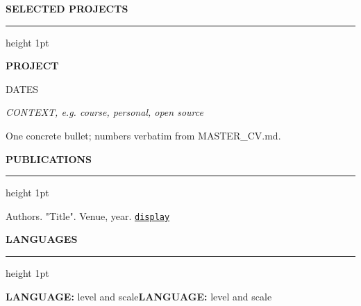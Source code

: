\documentclass[11pt]{article}
\newcommand{\keepwithnext}{\par\ifdim\dimexpr\pagegoal-\pagetotal\relax<5\baselineskip\newpage\fi}
\newcommand{\cvsection}[1]{%
  \keepwithnext\vspace{8pt}%
  {\displayfont\large\bfseries\color{accent}\MakeUppercase{#1}}\par
  \nointerlineskip\vspace{2.5pt}%
  {\color{accent}\hrule height 1pt}%
  \nointerlineskip\vspace{5pt}}
\newcommand{\cventry}[3]{%
  \noindent
  \begin{minipage}[t]{0.72\linewidth}\raggedright\strut\textbf{#1}\strut\end{minipage}%
  \hfill
  \begin{minipage}[t]{0.26\linewidth}\raggedleft\small\strut\textcolor{datecolor}{#2}\end{minipage}\par
  {\itshape #3}\par\vspace{1pt}}
\begin{document}

\cvsection{Selected Projects}

\cventry{{{PROJECT}}}{{{DATES}}}{{{CONTEXT, e.g. course, personal, open source}}}
\begin{cvitems}
  \item {{One concrete bullet; numbers verbatim from MASTER_CV.md.}}
\end{cvitems}
\vspace{5pt}


\cvsection{Publications}
{{Authors. "Title". Venue, year. \href{url}{\nolinkurl{display}}}}

\cvsection{Languages}
\textbf{{{LANGUAGE}}:} {{level and scale}}\quad\textbf{{{LANGUAGE}}:} {{level and scale}}
\end{document}
